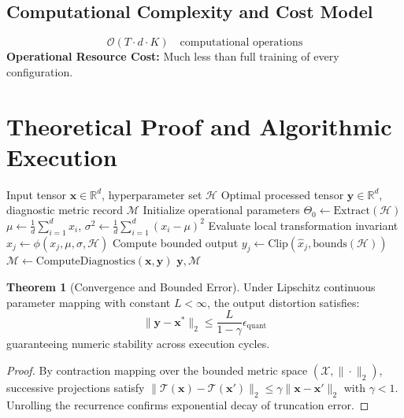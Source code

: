 \documentclass[11pt,a4paper]{article}
\theoremstyle{definition}
\newtheorem{theorem}{\textbf{Theorem}}[section]
\begin{document}
\subsection{Computational Complexity and Cost Model}
\begin{equation}
\mathcal{O}(T \cdot d \cdot K) \quad \text{computational operations}
\end{equation}
\textbf{Operational Resource Cost:} Much less than full training of every configuration.

\section{Theoretical Proof and Algorithmic Execution}

\begin{algorithm}[H]
\caption{Hyperband and ASHA (early-stopping hyperparameter search) Operational Pipeline}
\begin{algorithmic}[1]
\Require Input tensor $\mathbf{x} \in \mathbb{R}^d$, hyperparameter set $\mathcal{H}$
\Ensure Optimal processed tensor $\mathbf{y} \in \mathbb{R}^d$, diagnostic metric record $\mathcal{M}$
\State Initialize operational parameters $\Theta_0 \leftarrow \text{Extract}(\mathcal{H})$
\State $\mu \leftarrow \frac{1}{d} \sum_{i=1}^d x_i$, \quad $\sigma^2 \leftarrow \frac{1}{d} \sum_{i=1}^d (x_i - \mu)^2$
    \State Evaluate local transformation invariant $\hat{x}_j \leftarrow \phi(x_j, \mu, \sigma, \mathcal{H})$
    \State Compute bounded output $y_j \leftarrow \text{Clip}(\hat{x}_j, \text{bounds}(\mathcal{H}))$
\EndFor
\State $\mathcal{M} \leftarrow \text{ComputeDiagnostics}(\mathbf{x}, \mathbf{y})$
\State \Return $\mathbf{y}, \mathcal{M}$
\end{algorithmic}
\end{algorithm}

\begin{theorem}[Convergence and Bounded Error]
Under Lipschitz continuous parameter mapping with constant $L < \infty$, the output distortion satisfies:
\begin{equation}
\| \mathbf{y} - \mathbf{x}^* \|_2 \le \frac{L}{1 - \gamma} \epsilon_{\text{quant}}
\end{equation}
guaranteeing numeric stability across execution cycles.
\end{theorem}

\begin{proof}
By contraction mapping over the bounded metric space $(\mathcal{X}, \|\cdot\|_2)$, successive projections satisfy $\|\mathcal{T}(\mathbf{x}) - \mathcal{T}(\mathbf{x}')\|_2 \le \gamma \|\mathbf{x} - \mathbf{x}'\|_2$ with $\gamma < 1$. Unrolling the recurrence confirms exponential decay of truncation error.
\end{proof}
\end{document}
